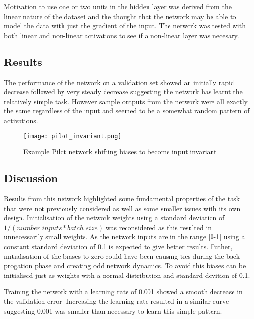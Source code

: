 
Motivation to use one or two units in the hidden layer was derived from the linear nature of the dataset and the thought that the network may be able to model the data with just the gradient of the input.
The network was tested with both linear and non-linear activations to see if a non-linear layer was necesary.

\subsection{Results}
The performance of the network on a validation set showed an initially rapid decrease followed by very steady decrease suggesting the network has learnt the relatively simple task.
However sample outputs from the network were all exactly the same regardless of the input and seemed to be a somewhat random pattern of activations.

\begin{figure}[h]
    \centering
    \texttt{[image: pilot\_invariant.png]}
    \caption{Example Pilot network shifting biases to become input invariant}
    \label{fig:pilotInvariance}
\end{figure}



\subsection{Discussion}
Results from this network highlighted some fundamental properties of the task that were not previously considered as well as some smaller issues with its own design.
Initialisation of the network weights using a standard deviation of $1 / ( number\_inputs * batch\_size )$ was reconsidered as this resulted in unnecessarily small weights. 
As the network inputs are in the range [0-1] using a constant standard deviation of 0.1 is expected to give better results. 
Futher, initialisation of the biases to zero could have been causing ties during the back-progation phase and creating odd network dynamics.
To avoid this biases can be initialised just as weights with a normal distribution and standard devition of 0.1.

Training the network with a learning rate of 0.001 showed a smooth decrease in the validation error. 
Increasing the learning rate resulted in a similar curve suggesting 0.001 was smaller than necessary to learn this simple pattern. 

